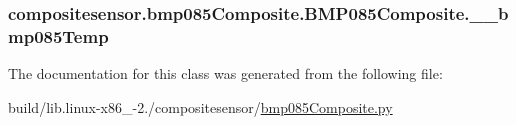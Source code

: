\subsubsection[{\+\_\+\+\_\+bmp085\+Temp}]{\setlength{\rightskip}{0pt plus 5cm}compositesensor.\+bmp085\+Composite.\+B\+M\+P085\+Composite.\+\_\+\+\_\+bmp085\+Temp\hspace{0.3cm}{\ttfamily [private]}}\label{classcompositesensor_1_1bmp085Composite_1_1BMP085Composite_a4fa8ea39bea0e8db5dfaf12f9b63763d}


The documentation for this class was generated from the following file\+:\begin{DoxyCompactItemize}
\item 
build/lib.\+linux-\/x86\+\_-\/2./compositesensor/\hyperlink{build_2lib_8linux-x86__64-2_87_2compositesensor_2bmp085Composite_8py}{bmp085\+Composite.\+py}\end{DoxyCompactItemize}
